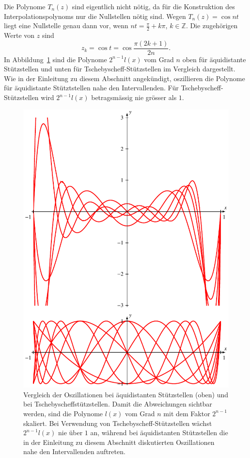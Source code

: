 Die Polynome $T_n(z)$ sind eigentlich nicht nötig, da für die Konstruktion
des Interpolationspolynoms nur die Nullstellen nötig sind.
Wegen $T_n(z)=\cos nt$ liegt eine Nullstelle genau dann vor, wenn
$nt = \frac{\pi}2 + k\pi$, $k\in\mathbb Z$.
Die zugehörigen Werte von $z$ sind
\[
z_k
=
\cos t = \cos\frac{\pi(2k+1)}{2n}.
\]
In Abbildung~\ref{buch:figure:tschebyscheff-vergleich} sind 
die Polynome $2^{n-1}l(x)$ vom Grad $n$ oben für äquidistante Stützstellen
und unten für Tschebyscheff-Stützstellen im Vergleich dargestellt.
Wie in der Einleitung zu diesem Abschnitt angekündigt, oszillieren die
Polynome für äquidistante Stütztstellen nahe den Intervallenden.
Für Tschebyscheff-Stützstellen wird $2^{n-1}l(x)$ betragsmässig nie
grösser als $1$.
\begin{figure}
\centering
\includegraphics{chapters/30-interpolation/figures/vergleich.pdf}
\caption{Vergleich der Oszillationen bei äquidistanten Stützstellen (oben)
und bei Tschebyscheffstützstellen.
Damit die Abweichungen sichtbar werden, sind die Polynome $l(x)$ vom Grad
$n$ mit dem Faktor $2^{n-1}$ skaliert.
Bei Verwendung von Tscheby\-scheff-Stützstellen wächst $2^{n-1}l(x)$
nie über $1$ an, während bei äquidistanten Stützstellen die in der
Einleitung zu diesem Abschnitt diskutierten Oszillationen nahe den
Intervallenden auftreten.
\label{buch:figure:tschebyscheff-vergleich}}
\end{figure}


